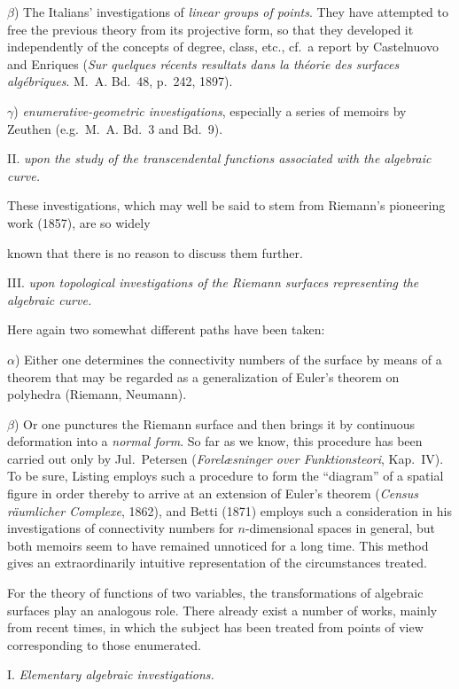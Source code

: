 \documentclass{article}
\begin{document}
$\beta$) The Italians' investigations of \emph{linear groups of points}. They have attempted to free the previous theory from its projective form, so that they developed it independently of the concepts of degree, class, etc., cf.\ a report by Castelnuovo and Enriques (\emph{Sur quelques récents resultats dans la théorie des surfaces algébriques}. M.~A. Bd.~48, p.~242, 1897).

$\gamma$) \emph{enumerative-geometric investigations}, especially a series of memoirs by Zeuthen (e.g.\ M.~A. Bd.~3 and Bd.~9).

II. \emph{upon the study of the transcendental functions associated with the algebraic curve.}

These investigations, which may well be said to stem from Riemann's pioneering work (1857), are so widely

known that there is no reason to discuss them further.

III. \emph{upon topological investigations of the Riemann surfaces representing the algebraic curve.}

Here again two somewhat different paths have been taken:

$\alpha$) Either one determines the connectivity numbers of the surface by means of a theorem that may be regarded as a generalization of Euler's theorem on polyhedra (Riemann, Neumann).

$\beta$) Or one punctures the Riemann surface and then brings it by continuous deformation into a \emph{normal form}. So far as we know, this procedure has been carried out only by Jul.\ Petersen (\emph{Forelæsninger over Funktionsteori}, Kap.~IV). To be sure, Listing employs such a procedure to form the “diagram” of a spatial figure in order thereby to arrive at an extension of Euler's theorem (\emph{Census räumlicher Complexe}, 1862), and Betti (1871) employs such a consideration in his investigations of connectivity numbers for $n$-dimensional spaces in general, but both memoirs seem to have remained unnoticed for a long time. This method gives an extraordinarily intuitive representation of the circumstances treated.

For the theory of functions of two variables, the transformations of algebraic surfaces play an analogous role. There already exist a number of works, mainly from recent times, in which the subject has been treated from points of view corresponding to those enumerated.

I. \emph{Elementary algebraic investigations.}
\end{document}
